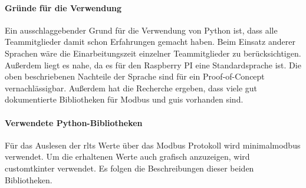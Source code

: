 \paragraph{Gründe für die Verwendung}
Ein ausschlaggebender Grund für die Verwendung von Python ist, dass alle Teammitglieder damit schon Erfahrungen gemacht haben. Beim Einsatz anderer Sprachen wäre die Einarbeitungszeit einzelner Teammitglieder zu berücksichtigen. Außerdem liegt es nahe, da es für den Raspberry PI eine Standardsprache ist. Die oben beschriebenen Nachteile der Sprache sind für ein Proof-of-Concept vernachlässigbar. Außerdem hat die Recherche ergeben, dass viele gut dokumentierte Bibliotheken für Modbus und \aclp{gui} vorhanden sind.

\paragraph{Verwendete Python-Bibliotheken}
Für das Auslesen der \acfp{rlt} Werte über das Modbus Protokoll wird minimalmodbus verwendet. Um die erhaltenen Werte auch grafisch anzuzeigen, wird customtkinter verwendet. Es folgen die Beschreibungen dieser beiden Bibliotheken.

